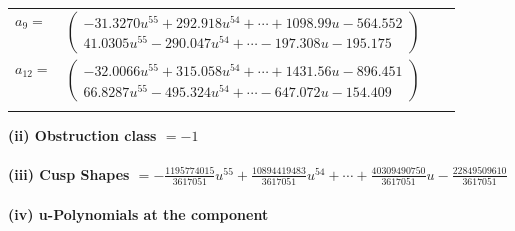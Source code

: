 \documentclass[1p]{elsarticle_modified}
\theoremstyle{definition}
\begin{document}
\begin{tabular}{m{7pt} m{180pt} m{7pt} m{180pt} }
\flushright $a_{9}=$&$\begin{pmatrix}-31.3270 u^{55}+292.918 u^{54}+\cdots+1098.99 u-564.552\\41.0305 u^{55}-290.047 u^{54}+\cdots-197.308 u-195.175\end{pmatrix}$ \\
\flushright $a_{12}=$&$\begin{pmatrix}-32.0066 u^{55}+315.058 u^{54}+\cdots+1431.56 u-896.451\\66.8287 u^{55}-495.324 u^{54}+\cdots-647.072 u-154.409\end{pmatrix}$\\&\end{tabular}
\flushleft \textbf{(ii) Obstruction class $= -1$}\\~\\
\flushleft \textbf{(iii) Cusp Shapes $= -\frac{1195774015}{3617051} u^{55}+\frac{10894419483}{3617051} u^{54}+\cdots+\frac{40309490750}{3617051} u-\frac{22849509610}{3617051}$}\\~\\
\newpage\renewcommand{\arraystretch}{1}
\flushleft \textbf{(iv) u-Polynomials at the component}\newline \\
\end{document}
